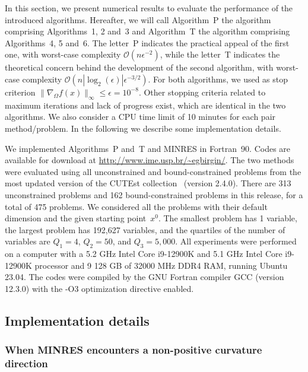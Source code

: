 \documentclass[11pt]{article}
\begin{document}
In this section, we present numerical results to evaluate the performance of the introduced algorithms. Hereafter, we will call Algorithm~P the algorithm comprising Algorithms~1, 2 and~3 and Algorithm~T the algorithm comprising Algorithms~4, 5 and~6. The letter~P indicates the practical appeal of the first one, with worst-case complexity $\mathcal{O}(n\epsilon^{-2})$, while the letter~T indicates the theoretical concern behind the development of the second algorithm, with worst-case complexity $\mathcal{O}(n|\log_2(\epsilon)|\epsilon^{-3/2})$. For both algorithms, we used as stop criterion $\| \nabla_{\Omega} f(x) \|_{\infty} \leq \epsilon = 10^{-8}$. Other stopping criteria related to maximum iterations and lack of progress exist, which are identical in the two algorithms. We also consider a CPU time limit of 10 minutes for each pair method/problem. In the following we describe some implementation details.

We implemented Algorithms~P and~T and MINRES in Fortran~90. Codes are available for download at \url{http://www.ime.usp.br/~egbirgin/}. The two methods were evaluated using all unconstrained and bound-constrained problems from the most updated version of the CUTEst collection~\cite{cutest} (version 2.4.0). There are 313 unconstrained problems and 162 bound-constrained problems in this release, for a total of 475 problems. We considered all the problems with their default dimension and the given starting point~$x^0$. The smallest problem has 1 variable, the largest problem has 192{,}627 variables, and the quartiles of the number of variables are $Q_1=4$, $Q_2=50$, and $Q_3=5{,}000$. All experiments were performed on a computer with a 5.2 GHz Intel Core i9-12900K and 5.1 GHz Intel Core i9-12900K processor and 9 128 GB of 32000 MHz DDR4 RAM, running Ubuntu 23.04. The codes were compiled by the GNU Fortran compiler GCC (version 12.3.0) with the -O3 optimization directive enabled.

\subsection{Implementation details} \label{sec31}

\subsubsection{When MINRES encounters a non-positive curvature direction} \label{sec311}
\end{document}
